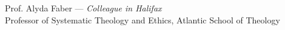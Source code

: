 \documentclass[11pt]{article}
\begin{document}

Prof. Alyda Faber --- \emph{Colleague in Halifax}\\
Professor of Systematic Theology and Ethics, Atlantic School of Theology\\



\end{document}

